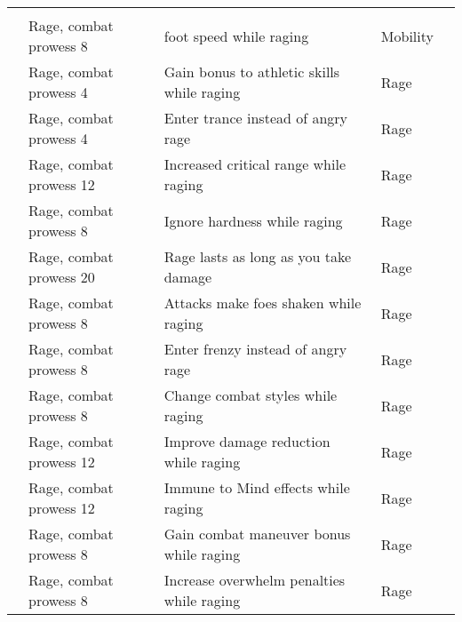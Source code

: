 \begin{longtabuwrapper}
\begin{longtabu}{>{\lcol}p{10em} >{\lcol}p{15em} >{\lcol}X >{\lcol}p{8em} >{\lcol}p{3em}}
        \midrule
         &  &  &  &  \\
                    & Rage, combat prowess 8                 &  foot speed while raging  & Mobility &  \\
                 & Rage, combat prowess 4                 & Gain bonus to athletic skills while raging & Rage &  \\
                  & Rage, combat prowess 4                 & Enter trance instead of angry rage & Rage &  \\
                 & Rage, combat prowess 12                & Increased critical range while raging & Rage &  \\
              & Rage, combat prowess 8                 & Ignore hardness while raging & Rage &  \\
                  & Rage, combat prowess 20                & Rage lasts as long as you take damage & Rage &  \\
                 & Rage, combat prowess 8                 & Attacks make foes shaken while raging & Rage &  \\
                        & Rage, combat prowess 8                 & Enter frenzy instead of angry rage & Rage &  \\
                 & Rage, combat prowess 8                 & Change combat styles while raging & Rage &  \\
             & Rage, combat prowess 12                & Improve damage reduction while raging & Rage &  \\
                 & Rage, combat prowess 12                & Immune to Mind effects while raging & Rage &  \\
             & Rage, combat prowess 8                & Gain combat maneuver bonus while raging & Rage &  \\
             & Rage, combat prowess 8                 & Increase overwhelm penalties while raging & Rage &  \\

\end{longtabu}
\end{longtabuwrapper}
